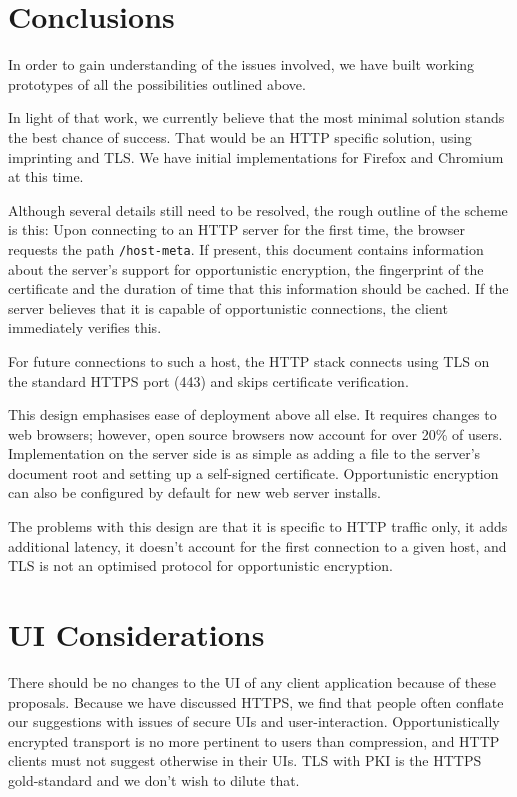 \documentclass[conference]{IEEEtran}
\begin{document}
\section{Conclusions}

In order to gain understanding of the issues involved, we have built working
prototypes of all the possibilities outlined above.

In light of that work, we currently believe that the most minimal solution
stands the best chance of success. That would be an HTTP specific solution,
using imprinting and TLS. We have initial implementations for Firefox and
Chromium at this time.

Although several details still need to be resolved, the rough
outline of the scheme is this: Upon connecting to an HTTP server for the first
time, the browser requests the path {\tt /host-meta}. If present,
this document\cite{hostmeta} contains information about the server's support for
opportunistic encryption, the fingerprint of the certificate and the duration of
time that this information should be cached. If the server believes that it
is capable of opportunistic connections, the client immediately verifies this.

For future connections to such a host, the HTTP stack connects using TLS on the
standard HTTPS port (443) and skips certificate verification.

This design emphasises ease of deployment above all else. It requires changes to
web browsers; however, open source browsers now account for over 20\% of
users\cite{netapp}. Implementation on the server side is as simple as adding a
file to the server's document root and setting up a self-signed certificate.
Opportunistic encryption can also be configured by default for new web server
installs.

The problems with this design are that it is specific to HTTP traffic only, it
adds additional latency, it doesn't account for the first connection to a given
host, and TLS is not an optimised protocol for opportunistic encryption.

\section{UI Considerations}

There should be no changes to the UI of any client application because of these
proposals. Because we have discussed HTTPS, we find that people often conflate
our suggestions with issues of secure UIs and user-interaction.
Opportunistically encrypted transport is no more pertinent to users than
compression, and HTTP clients must not suggest otherwise in their UIs.
TLS with PKI is the HTTPS gold-standard and we don't wish to dilute that.
\end{document}
